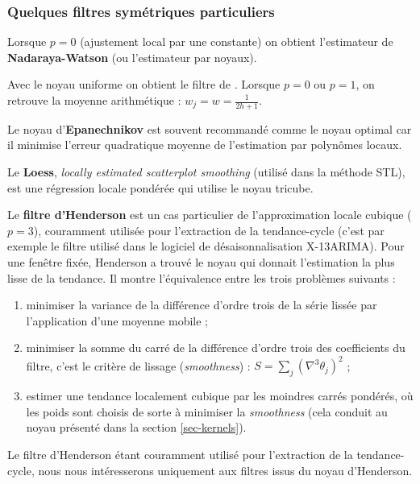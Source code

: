 \documentclass[
  12pt,
  a4paper,french]{article}
\providecommand{\tightlist}{%
  \setlength{\itemsep}{0pt}\setlength{\parskip}{0pt}}
\newcommand\1{\mathds{1}}
\begin{document}
\hypertarget{sec-sympolyfilter}{%
\subsubsection{Quelques filtres symétriques particuliers}\label{sec-sympolyfilter}}

Lorsque \(p=0\) (ajustement local par une constante) on obtient l'estimateur de \textbf{Nadaraya-Watson} (ou l'estimateur par noyaux).

Avec le noyau uniforme on obtient le filtre de \textcite{macaulay1931smoothing}.
Lorsque \(p=0\) ou \(p=1\), on retrouve la moyenne arithmétique : \(w_j=w=\frac{1}{2h+1}\).

Le noyau d'\textbf{Epanechnikov} est souvent recommandé comme le noyau optimal car il minimise l'erreur quadratique moyenne de l'estimation par polynômes locaux.

Le \textbf{Loess}, \emph{locally estimated scatterplot smoothing} (utilisé dans la méthode STL), est une régression locale pondérée qui utilise le noyau tricube.

Le \textbf{filtre d'Henderson} est un cas particulier de l'approximation locale cubique (\(p=3\)), couramment utilisée pour l'extraction de la tendance-cycle (c'est par exemple le filtre utilisé dans le logiciel de désaisonnalisation X-13ARIMA).
Pour une fenêtre fixée, Henderson a trouvé le noyau qui donnait l'estimation la plus lisse de la tendance.
Il montre l'équivalence entre les trois problèmes suivants :

\begin{enumerate}
\def\labelenumi{\arabic{enumi}.}
\tightlist
\item
  minimiser la variance de la différence d'ordre trois de la série lissée par l'application d'une moyenne mobile ;\\
\item
  minimiser la somme du carré de la différence d'ordre trois des coefficients du filtre, c'est le critère de lissage (\emph{smoothness}) : \(S=\sum_j(\nabla^{3}\theta_{j})^{2}\) ;\\
\item
  estimer une tendance localement cubique par les moindres carrés pondérés, où les poids sont choisis de sorte à minimiser la \emph{smoothness} (cela conduit au noyau présenté dans la section \ref{sec-kernels}).
\end{enumerate}

Le filtre d'Henderson étant couramment utilisé pour l'extraction de la tendance-cycle, nous nous intéresserons uniquement aux filtres issus du noyau d'Henderson.
\end{document}
